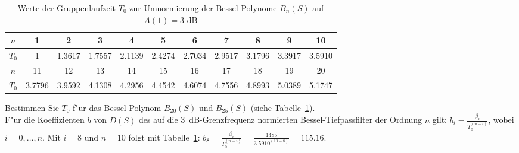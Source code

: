 \begin{table}[!htb] %
\begin{center}{\footnotesize
\begin{tabular}{|c||c|c|c|c|c|c|c|c|c|c|}\hline
$n$ & 1 & 2 & 3 & 4 & 5 & 6 & 7 & 8 & 9 & 10 \\ \hline
$T_0$ & 1 & 1.3617 & 1.7557 & 2.1139 & 2.4274 & 2.7034 & 2.9517 & 3.1796 & 3.3917 & 3.5910 \\ \hline \hline
$n$ & 11 & 12 & 13 & 14 & 15 & 16 & 17 & 18 & 19 & 20\\ \hline
$T_0$ & 3.7796 & 3.9592 & 4.1308 & 4.2956 & 4.4542 & 4.6074 & 4.7556 & 4.8993 & 5.0389 & 5.1747\\ \hline
\end{tabular}\caption{Werte der Gruppenlaufzeit $T_0$ zur Umnormierung der Bessel-Polynome $B_n(S)$ auf $A(1)=\text{3~dB}$ 
\label{werte-glaufz}}}
\end{center}
\end{table}\vspace*{-5mm}
\aufg
Bestimmen Sie $T_0$ f"ur das Bessel-Polynom $B_{20}(S)$ und $B_{25}(S)$ (siehe Tabelle~\ref{werte-glaufz}).\\
F"ur die Koeffizienten $b$ von $D(S)$ des auf die 3~dB-Grenzfrequenz normierten Bessel-Tiefpassfilter der Ordnung $n$ gilt: $b_i=\frac{\beta_i}{T_0^{(n-i)}}$, wobei $i=0,\ldots, n.$
Mit $i=8$ und $n=10$ folgt mit Tabelle~\ref{werte-glaufz}: $b_8=\frac{\beta_i}{T_0^{(n-i)}}=\frac{1485}{3.5910^{(10-8)}}=115.16$.
